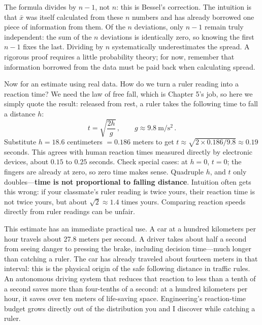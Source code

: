 \begin{challenge}
The formula divides by \(n-1\), not \(n\): this is Bessel's correction. The intuition is that \(\bar{x}\) was itself calculated from these \(n\) numbers and has already borrowed one piece of information from them. Of the \(n\) deviations, only \(n-1\) remain truly independent: the sum of the \(n\) deviations is identically zero, so knowing the first \(n-1\) fixes the last. Dividing by \(n\) systematically underestimates the spread. A rigorous proof requires a little probability theory; for now, remember that information borrowed from the data must be paid back when calculating spread.
\end{challenge}

Now for an estimate using real data. How do we turn a ruler reading into a reaction time? We need the law of free fall, which is Chapter 5's job, so here we simply quote the result: released from rest, a ruler takes the following time to fall a distance \(h\):
\[
t=\sqrt{\frac{2h}{g}}\,,\qquad g\approx 9.8\ \mathrm{m/s^2}\,.
\]
Substitute \(h=18.6\) centimeters \(=0.186\) meters to get \(t\approx\sqrt{2\times0.186/9.8}\approx 0.19\) seconds. This agrees with human reaction times measured directly by electronic devices, about \(0.15\) to \(0.25\) seconds. Check special cases: at \(h=0\), \(t=0\); the fingers are already at zero, so zero time makes sense. Quadruple \(h\), and \(t\) only doubles---\textbf{time is not proportional to falling distance}. Intuition often gets this wrong: if your classmate's ruler reading is twice yours, their reaction time is not twice yours, but about \(\sqrt{2}\approx1.4\) times yours. Comparing reaction speeds directly from ruler readings can be unfair.

This estimate has an immediate practical use. A car at a hundred kilometers per hour travels about 27.8 meters per second. A driver takes about half a second from seeing danger to pressing the brake, including decision time---much longer than catching a ruler. The car has already traveled about fourteen meters in that interval: this is the physical origin of the safe following distance in traffic rules. An autonomous driving system that reduces that reaction to less than a tenth of a second saves more than four-tenths of a second: at a hundred kilometers per hour, it saves over ten meters of life-saving space. Engineering's reaction-time budget grows directly out of the distribution you and I discover while catching a ruler.


